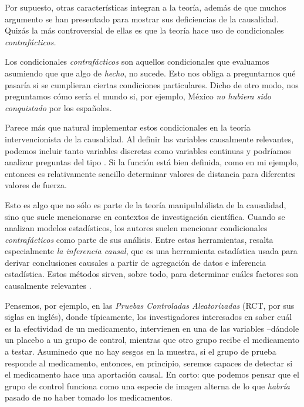Por supuesto, otras características integran a la teoría, además de que
muchos argumento se han presentado para mostrar sus deficiencias
de la causalidad. Quizás la más controversial de ellas es que la teoría
hace uso de condicionales \emph{contrafácticos. }

Los condicionales \emph{contrafácticos} son aquellos condicionales
que evaluamos asumiendo que que algo de \emph{hecho}, no sucede. Esto
nos obliga a preguntarnos qué pasaría si se cumplieran ciertas
condiciones particulares. Dicho de otro modo, nos preguntamos cómo
sería el mundo si, por ejemplo, México \emph{no hubiera sido
	conquistado} por los españoles.

Parece más que natural implementar estos condicionales en la teoría
intervencionista de la causalidad. Al definir las variables
causalmente relevantes, podemos incluir tanto variables discretas
como variables continuas y podríamos analizar preguntas del tipo
. Si la función está bien definida, como en
mi ejemplo, entonces es relativamente sencillo determinar valores de
distancia para diferentes valores de fuerza.

Esto es algo que no sólo es parte de la teoría manipulabilista de la
causalidad, sino que suele mencionarse en contextos de investigación
científica. Cuando se analizan modelos estadísticos, los autores
suelen mencionar condicionales \emph{contrafácticos} como parte de
sus análisis. Entre estas herramientas, resalta especialmente
\emph{la inferencia causal}, que es una herramienta estadística usada
para derivar conclusiones causales a partir de agregación de datos e
inferencia estadística. Estos métodos sirven, sobre todo, para
determinar cuáles factores son causalmente relevantes \parencite{Pearl2016, Pearl2018}.

Pensemos, por ejemplo, en las \emph{Pruebas Controladas
	Aleatorizadas} (RCT, por sus siglas en inglés), donde típicamente,
los investigadores interesados en saber cuál es la efectividad de un
medicamento, intervienen en una de las variables --dándole un placebo
a un grupo de control, mientras que otro grupo recibe el medicamento
a testar. Asuminedo que no hay sesgos en la muestra, si el grupo de
prueba responde al medicamento, entonces, en principio, seremos
capaces de detectar si el medicamento hace una aportación causal. En
corto: que podemos pensar que el grupo de control funciona como una
especie de imagen alterna de lo que \emph{habría} pasado de no haber
tomado los medicamentos.

